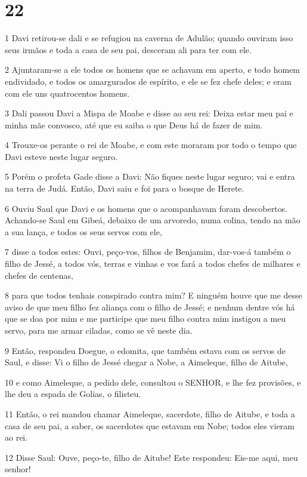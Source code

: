 \chapter{22}

\par 1 Davi retirou-se dali e se refugiou na caverna de Adulão; quando ouviram isso seus irmãos e toda a casa de seu pai, desceram ali para ter com ele.
\par 2 Ajuntaram-se a ele todos os homens que se achavam em aperto, e todo homem endividado, e todos os amargurados de espírito, e ele se fez chefe deles; e eram com ele uns quatrocentos homens.
\par 3 Dali passou Davi a Mispa de Moabe e disse ao seu rei: Deixa estar meu pai e minha mãe convosco, até que eu saiba o que Deus há de fazer de mim.
\par 4 Trouxe-os perante o rei de Moabe, e com este moraram por todo o tempo que Davi esteve neste lugar seguro.
\par 5 Porém o profeta Gade disse a Davi: Não fiques neste lugar seguro; vai e entra na terra de Judá. Então, Davi saiu e foi para o bosque de Herete.
\par 6 Ouviu Saul que Davi e os homens que o acompanhavam foram descobertos. Achando-se Saul em Gibeá, debaixo de um arvoredo, numa colina, tendo na mão a sua lança, e todos os seus servos com ele,
\par 7 disse a todos estes: Ouvi, peço-vos, filhos de Benjamim, dar-vos-á também o filho de Jessé, a todos vós, terras e vinhas e vos fará a todos chefes de milhares e chefes de centenas,
\par 8 para que todos tenhais conspirado contra mim? E ninguém houve que me desse aviso de que meu filho fez aliança com o filho de Jessé; e nenhum dentre vós há que se doa por mim e me participe que meu filho contra mim instigou a meu servo, para me armar ciladas, como se vê neste dia.
\par 9 Então, respondeu Doegue, o edomita, que também estava com os servos de Saul, e disse: Vi o filho de Jessé chegar a Nobe, a Aimeleque, filho de Aitube,
\par 10 e como Aimeleque, a pedido dele, consultou o SENHOR, e lhe fez provisões, e lhe deu a espada de Golias, o filisteu.
\par 11 Então, o rei mandou chamar Aimeleque, sacerdote, filho de Aitube, e toda a casa de seu pai, a saber, os sacerdotes que estavam em Nobe; todos eles vieram ao rei.
\par 12 Disse Saul: Ouve, peço-te, filho de Aitube! Este respondeu: Eis-me aqui, meu senhor!
